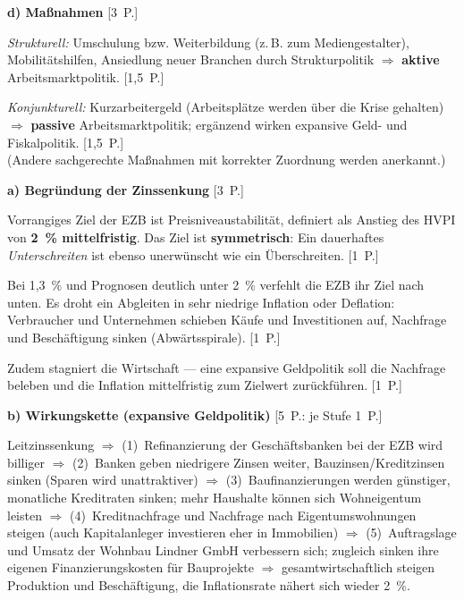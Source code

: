 \begin{loesung}[title={Lösung Aufgabe~3.4 --- Regionaler Arbeitsmarkt}]
\medskip
\textbf{d) Maßnahmen} \hfill [3~P.]

\emph{Strukturell:} Umschulung bzw. Weiterbildung (z.\,B. zum Mediengestalter),
Mobilitätshilfen, Ansiedlung neuer Branchen durch Strukturpolitik $\Rightarrow$
\textbf{aktive} Arbeitsmarktpolitik. [1,5~P.]

\emph{Konjunkturell:} Kurzarbeitergeld (Arbeitsplätze werden über die Krise gehalten)
$\Rightarrow$ \textbf{passive} Arbeitsmarktpolitik; ergänzend wirken expansive Geld- und
Fiskalpolitik. [1,5~P.]\\
{\small (Andere sachgerechte Maßnahmen mit korrekter Zuordnung werden anerkannt.)}
\end{loesung}

\begin{loesung}[title={Lösung Aufgabe~3.5 --- Leitzinssenkung der EZB}]
\textbf{a) Begründung der Zinssenkung} \hfill [3~P.]

Vorrangiges Ziel der EZB ist Preisniveaustabilität, definiert als Anstieg des HVPI von
\textbf{2~\% mittelfristig}. Das Ziel ist \textbf{symmetrisch}: Ein dauerhaftes
\emph{Unterschreiten} ist ebenso unerwünscht wie ein Überschreiten. [1~P.]

Bei 1,3~\% und Prognosen deutlich unter 2~\% verfehlt die EZB ihr Ziel nach unten. Es
droht ein Abgleiten in sehr niedrige Inflation oder Deflation: Verbraucher und
Unternehmen schieben Käufe und Investitionen auf, Nachfrage und Beschäftigung sinken
(Abwärtsspirale). [1~P.]

Zudem stagniert die Wirtschaft --- eine expansive Geldpolitik soll die Nachfrage beleben
und die Inflation mittelfristig zum Zielwert zurückführen. [1~P.]

\medskip
\textbf{b) Wirkungskette (expansive Geldpolitik)} \hfill [5~P.: je Stufe 1~P.]

Leitzinssenkung $\Rightarrow$
(1)~Refinanzierung der Geschäftsbanken bei der EZB wird billiger $\Rightarrow$
(2)~Banken geben niedrigere Zinsen weiter, Bauzinsen/Kreditzinsen sinken (Sparen wird
unattraktiver) $\Rightarrow$
(3)~Baufinanzierungen werden günstiger, monatliche Kreditraten sinken; mehr Haushalte
können sich Wohneigentum leisten $\Rightarrow$
(4)~Kreditnachfrage und Nachfrage nach Eigentumswohnungen steigen (auch Kapitalanleger
investieren eher in Immobilien) $\Rightarrow$
(5)~Auftragslage und Umsatz der Wohnbau Lindner GmbH verbessern sich; zugleich sinken
ihre eigenen Finanzierungskosten für Bauprojekte $\Rightarrow$ gesamtwirtschaftlich
steigen Produktion und Beschäftigung, die Inflationsrate nähert sich wieder 2~\%.


\end{loesung}
